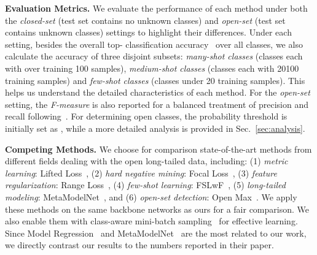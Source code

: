 \documentclass[10pt,twocolumn,letterpaper]{article}
\begin{document}
\vspace{2pt}
\noindent
\textbf{Evaluation Metrics.}
We evaluate the performance of each method under both  the \emph{closed-set} (test set contains no unknown classes) and \emph{open-set} (test set contains unknown classes) settings to highlight their differences.
Under each setting, besides the overall top- classification accuracy~\cite{gidaris2018dynamic} over all classes, we also calculate the accuracy of three disjoint subsets: \emph{many-shot classes} (classes each with over training 100 samples), \emph{medium-shot classes} (classes each with 20100 training samples) and \emph{few-shot classes} (classes under 20 training samples).
This helps us understand the detailed characteristics of each method.
For the \emph{open-set} setting, the \emph{F-measure} is also reported for a balanced treatment of precision and recall following~\cite{bendale2016towards}.
For determining open classes, the  probability threshold is initially set as , while a more detailed analysis is provided in Sec.~\ref{sec:analysis}.



\vspace{2pt}
\noindent
\textbf{Competing Methods.}
We choose for comparison state-of-the-art methods from different fields dealing with the open long-tailed data, including: (1) \emph{metric learning}: Lifted Loss~\cite{oh2016deep}, (2) \emph{hard negative mining}: Focal Loss~\cite{lin2017focal}, (3) \emph{feature regularization}: Range Loss~\cite{zhang2017range}, (4) \emph{few-shot learning}: FSLwF~\cite{gidaris2018dynamic}, (5) \emph{long-tailed modeling}: MetaModelNet~\cite{wang2017learning}, and (6) \emph{open-set detection}: Open Max~\cite{bendale2016towards}. 
We apply these methods on the same backbone networks as ours for a fair comparison.
We also enable them with class-aware mini-batch sampling~\cite{shen2016relay} for effective learning.
Since Model Regression~\cite{wang2016learning} and MetaModelNet~\cite{wang2017learning} are the most related to our work, we directly contrast our results to the numbers reported in their paper.
\end{document}
